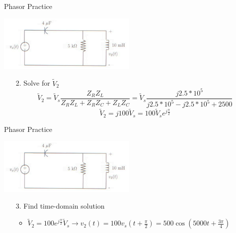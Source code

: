 \documentclass{beamer}
\begin{document}
    \begin{frame}{Phasor Practice}
        \begin{center}
            \includegraphics[width=0.5\textwidth]{phasor-practice.png}
        \end{center}
        \begin{enumerate}
            \item[2.] Solve for $\tilde{V}_2$
            $$\tilde{V}_2=\tilde{V}_s\frac{Z_RZ_L}{Z_RZ_L+Z_RZ_C+Z_LZ_C}=\tilde{V}_s\frac{j2.5*10^5}{j2.5*10^5-j2.5*10^5+2500}$$
            $$\tilde{V}_2=j100\tilde{V}_s=100\tilde{V}_se^{j\frac{\pi}{2}}$$
        \end{enumerate}
    \end{frame}
    
    \begin{frame}{Phasor Practice}
        \begin{center}
            \includegraphics[width=0.5\textwidth]{phasor-practice.png}
        \end{center}
        \begin{enumerate}
            \item[3.] Find time-domain solution
            \begin{itemize}
                \item $\tilde{V}_2=100e^{j\frac{\pi}{2}}\tilde{V}_s\rightarrow v_2(t)=100v_s(t+\frac{\pi}{2})=500\cos(5000t+\frac{3\pi}{4})$
            \end{itemize}
        \end{enumerate}
    \end{frame}
	
\end{document}
